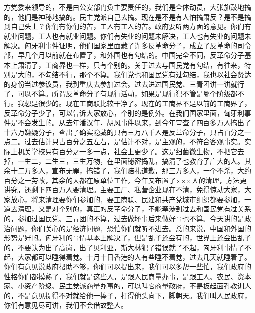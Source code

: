 方党委来领导的，不是由公安部门负主要责任的，我们是全体动员，大张旗鼓地搞的，他们是神秘地搞的。民主党派自己去搞。现在是不是有人怕搞肃反？是不是搞到自己头上？你们有你们的苦，工人有工人的苦。政府要听两方面的意见。你们有就业问题，工人也有就业问题。你们有失业的问题未解决，工人也有失业的问题未解决。匈牙利事件证明，他们国家里面藏了许多反革命分子，成立了反革命的司令部，早几个月以前就在布置了，和外国也有勾结的。中国完全不同，反革命分子基本上肃清了，工商界也一样，只有个别的。关于过去与国民党有勾结，有往来，特别是大的，不勾结不行，那个不算。我们党也和国民党有过勾结，我也以社会贤达的身份当过参议员，我到重庆去参加过会。过去进过国民党、三青团讲一讲就行了，可以不算。所谓反革命分子有现行活动，如果是现行犯不管是哪个阶级都不行。我想是很少的。现在工商联比较干净了。现在的工商界不是以前的工商界了，反革命分子少了，可以告诉大家放心，个别的是例外。在我们国家里面，匈牙利事件是不会发生的。从去年潘汉年、胡风事件以来，到今年审查了四百多万人搞出了十六万嫌疑分子，查出了确实隐藏的只有三万八千人是反革命分子，只占百分之一点二。过去估计只占百分之五左右，是估计不对，是主观的，不符合客观事实。实际上机关学校只有百分之一多一点，社会上更少了。这是细菌微生物，不把它去掉，一生二，二生三，三生万物，在里面秘密捣乱，搞清了也教育了广大的人。其余十二万多人，宣布无罪，搞错了，我们赔礼道歉，那三万多人，一个不杀，大约百分之一劳改，其余的人都在原单位工作。今年又布置了×××人的清理，方法更讲究，还剩下四百万人要清理。主要工厂、私营企业现在不清，免得惊动大家，大家放心，将来清理要你们参加的，要工商联、民建和共产党城市组织都要参加，一道去清理，又是对个别的，真正的反革命分子，不能牵涉到过去和国民党有过关系的，参加过国民党、三青团的不算，过去做坏事后来做好事也不算。今天讲的是政治问题，你们关心的是经济问题，恐怕你们就听不进去。总的来说，中国和外国的形势是好的。匈牙利的事情基本上解决了，但是乱子还会有的，世界上还会出乱子的，不要认为出了高岗，出了贝利亚，斯大林犯了错误就了不起，匈牙利事情了不起，大家都可以睡得着觉。十月十日香港的人有些睡不着觉，过去几天就睡着了。你们有意见说政府帮助不够，你们可以提出来，我们可以多帮一些忙，我们政府的性格你们都摸熟了，我们就是这些人，是跟人民商量办事，是跟工人、农民、资本家、小资产阶级、民主党派商量办事的，可以叫它商量政府，不是板起面孔教训人的，不是意见提得不对就给他一捧子，打得他头向下，脚朝天。我们叫人民政府，你们有意见尽可讲，我们不会借故整人。

